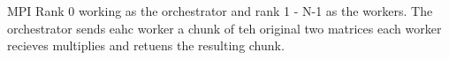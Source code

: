 \begin{frame}{MPI}
Rank 0 working as the orchestrator and rank 1 - N-1 as the workers. The orchestrator sends eahc worker a chunk of teh original two matrices 
each worker recieves multiplies and retuens the resulting chunk. 
\end{frame}